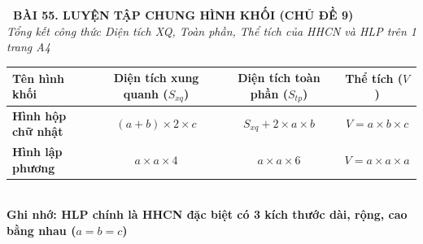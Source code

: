 \documentclass[14pt,a4paper,oneside]{extbook}
\begin{document}
\noindent
\begin{tcolorbox}[
  enhanced,
  colback=teal!8!white,
  colframe=teal!80!black,
  arc=3mm,
  boxrule=1.1pt,
  width=\linewidth,
  halign=center,
  top=2.2mm, bottom=2.2mm,
  left=3mm, right=3mm,
  drop fuzzy shadow
]
  {\large\bfseries\color{teal!95!black}\faBookmark\ BÀI 55. LUYỆN TẬP CHUNG HÌNH KHỐI (CHỦ ĐỀ 9)}\\[2pt]
  {\scriptsize\color{black!75}\itshape Tổng kết công thức Diện tích XQ, Toàn phần, Thể tích của HHCN và HLP trên 1 trang A4}
\end{tcolorbox}

\vspace{3.2mm}
\noindent
\begin{tcolorbox}[
  enhanced,
  title={\footnotesize\bfseries\color{white}\faTable\ 1. Bảng vàng công thức Hình hộp chữ nhật và Hình lập phương},
  colback=blue!2!white,
  colframe=blue!75!black,
  arc=2.5mm, boxrule=0.8pt, top=1.8mm, bottom=1.8mm, left=2mm, right=2mm
]
  \scriptsize
  \centering
  \begin{tabular}{|l|c|c|c|}
    \hline
    \textbf{Tên hình khối} & \textbf{Diện tích xung quanh ($S_{xq}$)} & \textbf{Diện tích toàn phần ($S_{tp}$)} & \textbf{Thể tích ($V$)} \\ \hline
    \textbf{Hình hộp chữ nhật} & $(a + b) \times 2 \times c$ & $S_{xq} + 2 \times a \times b$ & $V = a \times b \times c$ \\ \hline
    \textbf{Hình lập phương} & $a \times a \times 4$ & $a \times a \times 6$ & $V = a \times a \times a$ \\ \hline
  \end{tabular}\\[3pt]
  {\tiny\color{blue!85!black}\bfseries Ghi nhớ: HLP chính là HHCN đặc biệt có 3 kích thước dài, rộng, cao bằng nhau ($a = b = c$)}
\end{tcolorbox}

\vspace{3mm}
\end{document}
